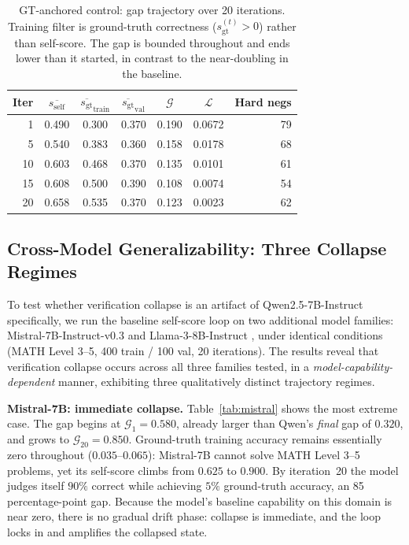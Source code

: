 \documentclass{article}
\newcommand{\gap}{\mathcal{G}}          %
\newcommand{\self}{s_{\text{self}}}     %
\newcommand{\gt}{s_{\text{gt}}}         %
\begin{document}
\begin{table}[h]
\centering
\caption{GT-anchored control: gap trajectory over 20 iterations.
Training filter is ground-truth correctness ($\gt^{(t)} > 0$) rather than
self-score. The gap is bounded throughout and ends lower than it started,
in contrast to the near-doubling in the baseline.}
\label{tab:gtanchored}
\small
\begin{tabular}{rcccccr}
\toprule
Iter & $\overline{\self}$ & $\overline{\gt}_\text{train}$ & $\overline{\gt}_\text{val}$ & $\gap$ & $\mathcal{L}$ & Hard negs \\
\midrule
1  & 0.490 & 0.300 & 0.370 & 0.190 & 0.0672 & 79 \\
5  & 0.540 & 0.383 & 0.360 & 0.158 & 0.0178 & 68 \\
10 & 0.603 & 0.468 & 0.370 & 0.135 & 0.0101 & 61 \\
15 & 0.608 & 0.500 & 0.390 & 0.108 & 0.0074 & 54 \\
20 & 0.658 & 0.535 & 0.370 & 0.123 & 0.0023 & 62 \\
\bottomrule
\end{tabular}
\end{table}

\subsection{Cross-Model Generalizability: Three Collapse Regimes}

To test whether verification collapse is an artifact of Qwen2.5-7B-Instruct
specifically, we run the baseline self-score loop on two additional model
families: Mistral-7B-Instruct-v0.3 \citep{jiang2023mistral} and
Llama-3-8B-Instruct \citep{llama3team2024}, under identical conditions
(MATH Level 3--5, 400 train / 100 val, 20 iterations).
The results reveal that verification collapse occurs across all three
families tested, in a \emph{model-capability-dependent} manner, exhibiting
three qualitatively distinct trajectory regimes.

\textbf{Mistral-7B: immediate collapse.}
Table~\ref{tab:mistral} shows the most extreme case.
The gap begins at $\gap_1 = 0.580$, already larger than Qwen's
\emph{final} gap of $0.320$, and grows to $\gap_{20} = 0.850$.
Ground-truth training accuracy remains essentially zero throughout
($0.035$--$0.065$): Mistral-7B cannot solve MATH Level 3--5 problems, yet
its self-score climbs from $0.625$ to $0.900$.
By iteration~20 the model judges itself $90\%$ correct while achieving $5\%$
ground-truth accuracy, an 85 percentage-point gap.
Because the model's baseline capability on this domain is near zero, there is
no gradual drift phase: collapse is immediate, and the loop locks in and
amplifies the collapsed state.
\end{document}
